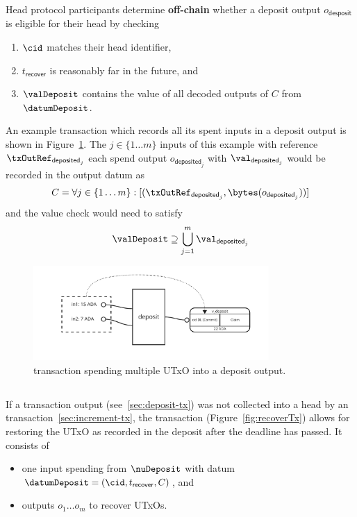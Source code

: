 \noindent Head protocol participants determine \textbf{off-chain} whether a
deposit output $o_{\mathsf{desposit}}$ is eligible for their head by checking
\begin{enumerate}
  \item $\cid$ matches their head identifier,
  \item $t_{\mathsf{recover}}$ is reasonably far in the future, and
  \item $\valDeposit$ contains the value of all decoded outputs of $C$ from $\datumDeposit$.
\end{enumerate}

\noindent An example transaction which records all its spent inputs in a deposit output is
shown in Figure~\ref{fig:depositTx}. The $j \in \{1 \dots m\}$ inputs of this example with reference $\txOutRef_{\mathsf{deposited}_{j}}$ each spend output $o_{\mathsf{deposited}_{j}}$ with $\val_{\mathsf{deposited}_{j}}$ would be recorded in the output datum as
\[
  C = \forall j \in \{1 \dots m\} : [(\txOutRef_{\mathsf{deposited}_{j}},\bytes(o_{\mathsf{deposited}_{j}}))]
\]
\noindent and the value check would need to satisfy
\[
  \valDeposit \supseteq \bigcup_{j=1}^{m} \val_{\mathsf{deposited}_{j}}
\]

\begin{figure}
  \centering
  \includegraphics[width=0.8\textwidth]{Hydra/Protocol/Figures/deposit-tx}
  \caption{\mtxDeposit{} transaction spending multiple UTxO into a deposit
	output.}\label{fig:depositTx}
\end{figure}

\subsection{}\label{sec:recover-tx}

\noindent If a \mtxDeposit{} transaction output (see~\ref{sec:deposit-tx}) was
not collected into a head by an \mtxIncrement{}
transaction~\ref{sec:increment-tx}, the \mtxRecover{} transaction
(Figure~\ref{fig:recoverTx}) allows for restoring the UTxO as recorded in the
deposit after the deadline has passed. It consists of
\begin{itemize}
  \item one input spending from $\nuDeposit$ with datum $\datumDeposit = (\cid, t_{\mathsf{recover}}, C)$, and
  \item outputs $o_{1} \dots o_{m}$ to recover UTxOs.
\end{itemize}

